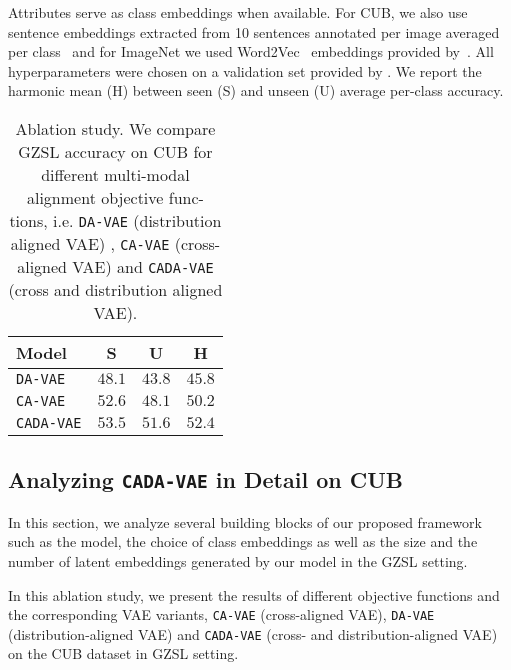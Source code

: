 \documentclass[10pt,twocolumn,letterpaper]{article}
\newcommand{\myparagraph}[1]{\vspace{6pt}\noindent{\bf #1}}
\begin{document}
Attributes serve as class embeddings when available. For CUB, we also use sentence embeddings extracted from 10 sentences annotated per image averaged per class~\cite{reed} and for ImageNet we used Word2Vec~\cite{mikolov2013distributed} embeddings provided by~\cite{sync}.
All hyperparameters were chosen on a validation set provided by \cite{goodbadugly}. We report the harmonic mean (H) between seen (S) and unseen (U) average per-class accuracy.

{
\setlength{\tabcolsep}{6pt}
\renewcommand{\arraystretch}{1.2}
\begin{center}
\centering
\begin{table}[t]
\centering
\begin{tabular}{ l ccc}
 Model & \textbf{S}  & \textbf{U}  & \textbf{H} \\
 \hline
\texttt{DA-VAE} & $48.1$ & $43.8$ & $45.8$ \\
\texttt{CA-VAE} & $52.6$ & $48.1$ & $50.2$ \\
\texttt{CADA-VAE} & $\mathbf{53.5}$ & $\mathbf{51.6}$ & $\mathbf{52.4}$ \\
\end{tabular}
\caption{Ablation study. We compare GZSL accuracy on
CUB for different multi-modal alignment objective func-
tions, i.e. \texttt{DA-VAE} (distribution aligned VAE)
, \texttt{CA-VAE} (cross-aligned VAE) 
and \texttt{CADA-VAE} (cross and distribution aligned VAE).}
\label{table:ablation}
\end{table}
\end{center}
}


\vspace{-10mm}
\subsection{Analyzing \textbf{\texttt{CADA-VAE}} in Detail on CUB} 
\label{sec:cub-analysis}
In this section, we analyze several building blocks of our proposed framework such as the model, the choice of class embeddings as well as the size and the number of latent embeddings generated by our model in the GZSL setting.


\myparagraph{Analyzing Model Variants.}
In this ablation study, we present the results of different objective functions and the corresponding VAE variants, \texttt{CA-VAE} (cross-aligned VAE), \texttt{DA-VAE} (distribution-aligned VAE) and \texttt{CADA-VAE} (cross- and distribution-aligned VAE) on the CUB dataset in GZSL setting. 
\end{document}
